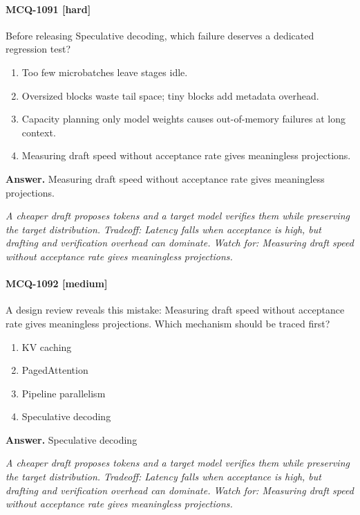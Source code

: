 \paragraph{MCQ-1091 [hard]} Before releasing Speculative decoding, which failure deserves a dedicated regression test?
\begin{enumerate}[label=\Alph*.]
\item Too few microbatches leave stages idle.
\item Oversized blocks waste tail space; tiny blocks add metadata overhead.
\item Capacity planning only model weights causes out-of-memory failures at long context.
\item Measuring draft speed without acceptance rate gives meaningless projections.
\end{enumerate}
\noindent\textbf{Answer.} Measuring draft speed without acceptance rate gives meaningless projections.
\par\textit{A cheaper draft proposes tokens and a target model verifies them while preserving the target distribution. Tradeoff: Latency falls when acceptance is high, but drafting and verification overhead can dominate. Watch for: Measuring draft speed without acceptance rate gives meaningless projections.}
\paragraph{MCQ-1092 [medium]} A design review reveals this mistake: Measuring draft speed without acceptance rate gives meaningless projections. Which mechanism should be traced first?
\begin{enumerate}[label=\Alph*.]
\item KV caching
\item PagedAttention
\item Pipeline parallelism
\item Speculative decoding
\end{enumerate}
\noindent\textbf{Answer.} Speculative decoding
\par\textit{A cheaper draft proposes tokens and a target model verifies them while preserving the target distribution. Tradeoff: Latency falls when acceptance is high, but drafting and verification overhead can dominate. Watch for: Measuring draft speed without acceptance rate gives meaningless projections.}
